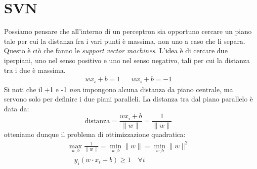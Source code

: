 \section{SVN}
Possiamo pensare che all'interno di un perceptron sia opportuno cercare un piano tale per cui la distanza fra i vari punti è massima, non uno a caso che li separa. Questo è ciò che fanno le \textit{support vector machines}.
\vskip3mm
L'idea è di cercare due iperpiani, uno nel senso positivo e uno nel senso negativo, tali per cui la distanza tra i due è massima.
\begin{align*}
	w x_i + b = 1 &  & wx_i + b = -1
\end{align*}
Si noti che il +1 e -1 \textit{non} impongono alcuna distanza da piano centrale, ma servono solo per definire i due piani paralleli. La distanza tra dal piano parallelo è data da:
\[
	\text{distanza} = \frac{w x_i + b}{\|w\|} = \frac{1}{\|w\|}
\]
otteniamo dunque il problema di ottimizzazione quadratica:
\begin{gather*}
	\max_{w, b}\frac{1}{\|w\|} = \min_{w, b} \|w\|                                      = \min_{w, b} \|w\|^2 \\
	\quad y_i (w \cdot x_i + b) \geq 1 \quad \forall i
\end{gather*}
